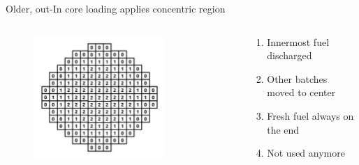 \documentclass[aspectratio=1610,pdftex,dvipsnames,compress,xcolor={dvipsnames}]{beamer}
\begin{document}
\begin{frame}{Older, out-In core loading applies concentric region}
    \begin{columns}

        \begin{column}{0.55\textwidth}
            \begin{figure}
                \centering
                \includegraphics[width=0.75\textwidth]{core_out.in.jpg}
            \end{figure}
        \end{column}

        \begin{column}{0.45\textwidth}
            \begin{enumerate}[series=outerlist,topsep=0pt,itemsep=15pt,leftmargin=*,label=(\arabic*)]
                \item[]Innermost fuel discharged
                \item[]Other batches moved to center
                \item[]Fresh fuel always on the end
                \item[]Not used anymore
            \end{enumerate}
        \end{column}

    \end{columns}
\end{frame}
\end{document}
